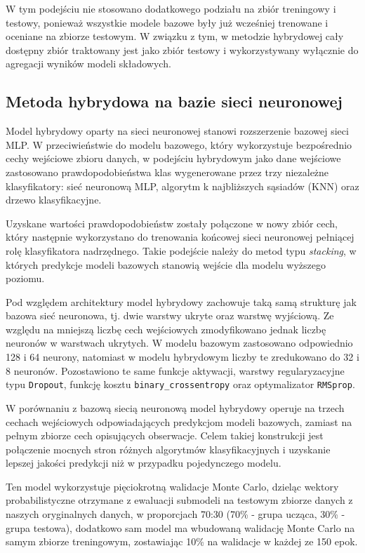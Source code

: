 \documentclass[twoside]{customStyle}
\begin{document}
W tym podejściu nie stosowano dodatkowego podziału na zbiór treningowy i testowy, ponieważ wszystkie modele bazowe były już wcześniej trenowane i oceniane na zbiorze testowym. W związku z tym, w metodzie hybrydowej cały dostępny zbiór traktowany jest jako zbiór testowy i wykorzystywany wyłącznie do agregacji wyników modeli składowych.

\subsection{Metoda hybrydowa na bazie sieci neuronowej}
Model hybrydowy oparty na sieci neuronowej stanowi rozszerzenie bazowej sieci MLP. W przeciwieństwie do modelu bazowego, który wykorzystuje bezpośrednio cechy wejściowe zbioru danych, w podejściu hybrydowym jako dane wejściowe zastosowano prawdopodobieństwa klas wygenerowane przez trzy niezależne klasyfikatory: sieć neuronową MLP, algorytm k najbliższych sąsiadów (KNN) oraz drzewo klasyfikacyjne.

Uzyskane wartości prawdopodobieństw zostały połączone w nowy zbiór cech, który następnie wykorzystano do trenowania końcowej sieci neuronowej pełniącej rolę klasyfikatora nadrzędnego. Takie podejście należy do metod typu \textit{stacking}, w których predykcje modeli bazowych stanowią wejście dla modelu wyższego poziomu.

Pod względem architektury model hybrydowy zachowuje taką samą strukturę jak bazowa sieć neuronowa, tj. dwie warstwy ukryte oraz warstwę wyjściową. Ze względu na mniejszą liczbę cech wejściowych zmodyfikowano jednak liczbę neuronów w warstwach ukrytych. W modelu bazowym zastosowano odpowiednio 128 i 64 neurony, natomiast w modelu hybrydowym liczby te zredukowano do 32 i 8 neuronów. Pozostawiono te same funkcje aktywacji, warstwy regularyzacyjne typu \texttt{Dropout}, funkcję kosztu \texttt{binary\_crossentropy} oraz optymalizator \texttt{RMSprop}.

W porównaniu z bazową siecią neuronową model hybrydowy operuje na trzech cechach wejściowych odpowiadających predykcjom modeli bazowych, zamiast na pełnym zbiorze cech opisujących obserwacje. Celem takiej konstrukcji jest połączenie mocnych stron różnych algorytmów klasyfikacyjnych i uzyskanie lepszej jakości predykcji niż w przypadku pojedynczego modelu.

Ten model wykorzystuje pięciokrotną walidacje Monte Carlo, dzieląc wektory probabilistyczne otrzymane z ewaluacji submodeli na testowym zbiorze danych z naszych oryginalnych danych, w proporcjach 70:30 (70\% - grupa ucząca, 30\% - grupa testowa), dodatkowo sam model ma wbudowaną walidację Monte Carlo na samym zbiorze treningowym, zostawiając 10\% na walidacje w każdej ze 150 epok.
\end{document}
